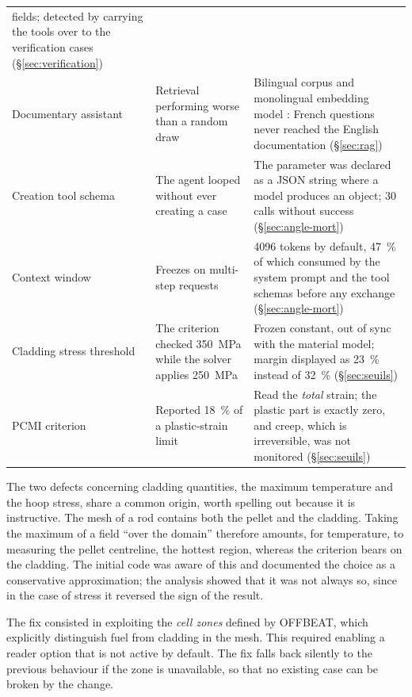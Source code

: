 \begin{table}[htbp]
\begin{tabularx}{\textwidth}{@{}>{\raggedright\arraybackslash}p{3.3cm}XX@{}}
  fields; detected by carrying the tools over to the verification cases
  (§\ref{sec:verification})\\
\addlinespace
Documentary assistant & Retrieval performing worse than a random draw &
  Bilingual corpus and monolingual embedding model : French questions never
  reached the English documentation (§\ref{sec:rag})\\
\addlinespace
Creation tool schema & The agent looped without ever creating a case & The
  parameter was declared as a JSON string where a model produces an object;
  30 calls without success (§\ref{sec:angle-mort})\\
\addlinespace
Context window & Freezes on multi-step requests & \num{4096} tokens by default,
  \SI{47}{\percent} of which consumed by the system prompt and the tool schemas
  before any exchange (§\ref{sec:angle-mort})\\
\addlinespace
Cladding stress threshold & The criterion checked \SI{350}{\mega\pascal} while
  the solver applies \SI{250}{\mega\pascal} & Frozen constant, out of sync with
  the material model; margin displayed as \SI{23}{\percent} instead of
  \SI{32}{\percent} (§\ref{sec:seuils})\\
\addlinespace
PCMI criterion & Reported \SI{18}{\percent} of a plastic-strain limit & Read the
  \emph{total} strain; the plastic part is exactly zero, and creep, which is
  irreversible, was not monitored (§\ref{sec:seuils})\\
\bottomrule
\end{tabularx}
\end{table}

The two defects concerning cladding quantities, the maximum temperature and the
hoop stress, share a common origin, worth spelling out because it is
instructive. The mesh of a rod contains both the pellet and the cladding. Taking
the maximum of a field ``over the domain'' therefore amounts, for temperature,
to measuring the pellet centreline, the hottest region, whereas the criterion
bears on the cladding. The initial code was aware of this and documented the
choice as a conservative approximation; the analysis showed that it was not
always so, since in the case of stress it reversed the sign of the result.

The fix consisted in exploiting the \textit{cell zones} defined by OFFBEAT,
which explicitly distinguish fuel from cladding in the mesh. This required
enabling a reader option that is not active by default. The fix falls back
silently to the previous behaviour if the zone is unavailable, so that no
existing case can be broken by the change.

